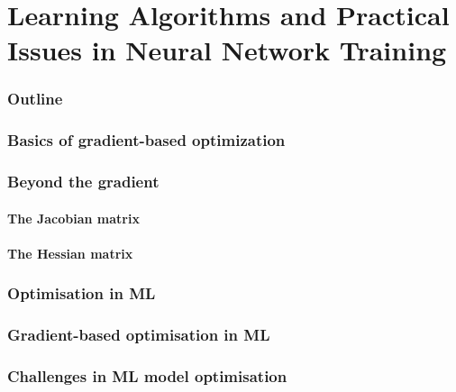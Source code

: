 \renewcommand{\thispart}{4 }
\renewcommand{\thispartname}{Learning Algorithms and Practical Issues in Neural Network Training}

\part{\thispartname}

\section{Outline}






\section{Basics of gradient-based optimization}

\section{Beyond the gradient}
\subsection{The Jacobian matrix}

\subsection{The Hessian matrix}


\section{Optimisation in ML}


\section{Gradient-based optimisation in ML}


\section{Challenges in ML model optimisation}

